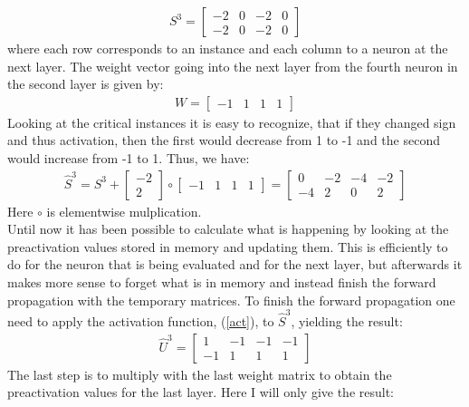 \begin{align*}
    S^3 = 
    \begin{bmatrix}
        -2 & 0 & -2 & 0 \\
        -2 & 0 & -2 & 0 
    \end{bmatrix}
\end{align*}
where each row corresponds to an instance and each column to a neuron at the next layer. The weight vector going into the next layer from the fourth neuron in the second layer is given by:
\begin{align*}
    W = 
    \begin{bmatrix}
        -1 & 1 & 1 & 1
    \end{bmatrix}
\end{align*}
Looking at the critical instances it is easy to recognize, that if they changed sign and thus activation, then the first would decrease from 1 to -1 and the second would increase from -1 to 1. Thus, we have:
\begin{align*}
    \hat{S}^3 = S^3 + 
    \begin{bmatrix}
        -2 \\
        2
    \end{bmatrix}
    \circ 
    \begin{bmatrix}
        -1 & 1 & 1 & 1 
    \end{bmatrix}
    = 
    \begin{bmatrix}
        0 & -2 & -4 & -2 \\
        -4 & 2 & 0 & 2 
    \end{bmatrix}
\end{align*}
Here $\circ$ is elementwise mulplication. \\
\noindent Until now it has been possible to calculate what is happening by looking at the preactivation values stored in memory and updating them. This is efficiently to do for the neuron that is being evaluated and for the next layer, but afterwards it makes more sense to forget what is in memory and instead finish the forward propagation with the temporary matrices. To finish the forward propagation one need to apply the activation function, (\ref{act}), to $\hat{S}^3$, yielding the result: 
\begin{align*}
    \hat{U}^3 = 
    \begin{bmatrix}
        1 & -1 & -1 & -1 \\
        -1 & 1 & 1 & 1 
    \end{bmatrix}
\end{align*}
The last step is to multiply with the last weight matrix to obtain the preactivation values for the last layer. Here I will only give the result:
